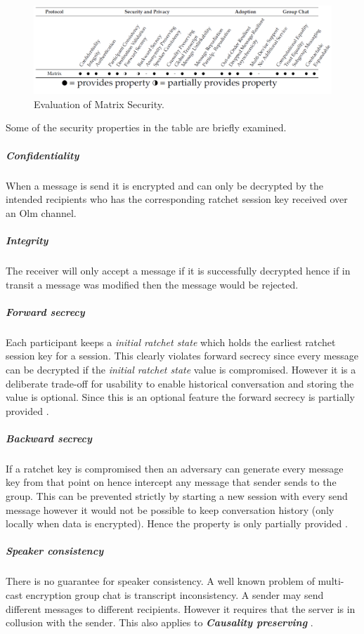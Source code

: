\begin{figure}[H]
	\hspace*{-1.7cm} 
	\centering
	\includegraphics[width=16cm]{figures/framework.png}
	\caption{Evaluation of Matrix Security.}
	\label{fig:framework}
\end{figure}

Some of the security properties in the table are briefly examined.

\subparagraph{Confidentiality} When a message is send it is encrypted and can only be decrypted by the intended recipients who has the corresponding ratchet session key received over an Olm channel. 

\subparagraph{Integrity} The receiver will only accept a message if it is successfully decrypted hence if in transit a message was modified then the message would be rejected. 


\subparagraph{Forward secrecy} Each participant keeps a \emph{initial ratchet state} which holds the earliest ratchet session key for a session. This clearly violates forward secrecy since every message can be decrypted if the \emph{initial ratchet state} value is compromised. However it is a deliberate trade-off for usability to enable historical conversation and storing the value is optional. Since this is an optional feature the forward secrecy is partially provided \cite{ncc}. 


\subparagraph{Backward secrecy} If a ratchet key is compromised then an adversary can generate every message key from that point on hence intercept any message that sender sends to the group. This can be prevented strictly by starting a new session with every send message however it would not be possible to keep conversation history (only locally when data is encrypted). Hence the property is only partially provided \cite{ncc}.



\subparagraph{Speaker consistency}

There is no guarantee for speaker consistency. A well known problem of multi-cast encryption group chat is transcript inconsistency. A sender may send different messages to different recipients. However it requires that the server is in collusion with the sender. This also applies to \emph{\textbf{Causality preserving}} \cite{ncc}.


